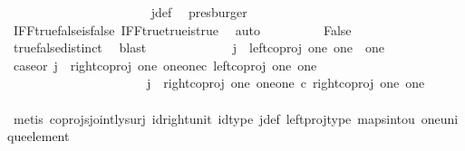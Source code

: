 \begin{isabellebody}
\ \ \ \ \ \ \isamarkupfalse%
\ \isamarkupfalse%
\ {\isachardoublequoteopen}{\isasymlangle}{\isasymt}{\isacharcomma}{\kern0pt}\ {\isasymt}{\isasymrangle}\ {\isacharequal}{\kern0pt}\ {\isasymlangle}{\isasymt}{\isacharcomma}{\kern0pt}{\isasymf}{\isasymrangle}{\isachardoublequoteclose}\isanewline
\ \ \ \ \ \ \ \ \isamarkupfalse%
\ j{\isacharunderscore}{\kern0pt}def\ \isamarkupfalse%
\ presburger\isanewline
\ \ \ \ \ \ \isamarkupfalse%
\ \isamarkupfalse%
\ {\isachardoublequoteopen}{\isasymt}\ {\isacharequal}{\kern0pt}\ {\isasymf}{\isachardoublequoteclose}\isanewline
\ \ \ \ \ \ \ \ \isamarkupfalse%
\ IFF{\isacharunderscore}{\kern0pt}true{\isacharunderscore}{\kern0pt}false{\isacharunderscore}{\kern0pt}is{\isacharunderscore}{\kern0pt}false\ IFF{\isacharunderscore}{\kern0pt}true{\isacharunderscore}{\kern0pt}true{\isacharunderscore}{\kern0pt}is{\isacharunderscore}{\kern0pt}true\ \isamarkupfalse%
\ auto\isanewline
\ \ \ \ \ \ \isamarkupfalse%
\ \isamarkupfalse%
\ False\isanewline
\ \ \ \ \ \ \ \ \isamarkupfalse%
\ true{\isacharunderscore}{\kern0pt}false{\isacharunderscore}{\kern0pt}distinct\ \isamarkupfalse%
\ blast\isanewline
\ \ \ \ \isamarkupfalse%
\isanewline
\ \ \isamarkupfalse%
\isanewline
\ \ \ \ \isamarkupfalse%
\ {\isachardoublequoteopen}j\ {\isasymnoteq}\ left{\isacharunderscore}{\kern0pt}coproj\ one\ {\isacharparenleft}{\kern0pt}one\ {\isasymCoprod}\ one{\isacharparenright}{\kern0pt}{\isachardoublequoteclose}\isanewline
\ \ \ \ \isamarkupfalse%
\ \isamarkupfalse%
\ case{}{\isacharunderscore}{\kern0pt}or{\isacharunderscore}{\kern0pt}{}{\isacharcolon}{\kern0pt}\ {\isachardoublequoteopen}j\ {\isacharequal}{\kern0pt}\ right{\isacharunderscore}{\kern0pt}coproj\ one\ {\isacharparenleft}{\kern0pt}one{\isasymCoprod}one{\isacharparenright}{\kern0pt}{\isasymcirc}\isactrlsub c\ left{\isacharunderscore}{\kern0pt}coproj\ one\ one\ {\isasymor}\ \isanewline
\ \ \ \ \ \ \ \ \ \ \ \ \ \ \ \ \ \ \ \ \ \ j\ {\isacharequal}{\kern0pt}\ right{\isacharunderscore}{\kern0pt}coproj\ one\ {\isacharparenleft}{\kern0pt}one{\isasymCoprod}one{\isacharparenright}{\kern0pt}\ {\isasymcirc}\isactrlsub c\ right{\isacharunderscore}{\kern0pt}coproj\ one\ one{\isachardoublequoteclose}\isanewline
\ \ \ \ \ \ \isamarkupfalse%
\ {\isacharparenleft}{\kern0pt}metis\ coprojs{\isacharunderscore}{\kern0pt}jointly{\isacharunderscore}{\kern0pt}surj\ id{\isacharunderscore}{\kern0pt}right{\isacharunderscore}{\kern0pt}unit{}\ id{\isacharunderscore}{\kern0pt}type\ j{\isacharunderscore}{\kern0pt}def\ left{\isacharunderscore}{\kern0pt}proj{\isacharunderscore}{\kern0pt}type\ maps{\isacharunderscore}{\kern0pt}into{\isacharunderscore}{\kern0pt}{}u{}\ one{\isacharunderscore}{\kern0pt}unique{\isacharunderscore}{\kern0pt}element{\isacharparenright}{\kern0pt}\isanewline

\end{isabellebody}
